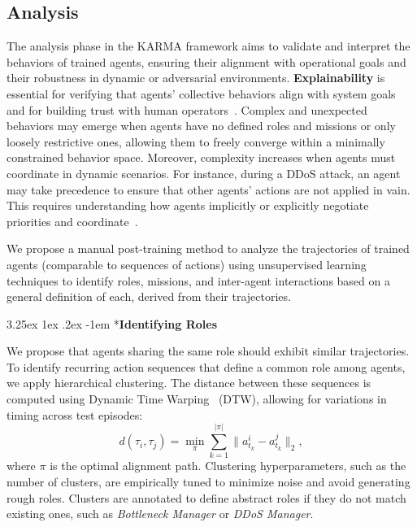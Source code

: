 \documentclass[conference]{IEEEtran}
\makeatletter
\renewcommand\paragraph{\@startsection{paragraph}{5}{\z@}%
  {3.25ex \@plus1ex \@minus.2ex}%
  {-1em}%
  {\normalfont\normalsize\bfseries}}
\makeatother
\begin{document}
\subsection{Analysis}
\label{sec:analysis}


The analysis phase in the KARMA framework aims to validate and interpret the behaviors of trained agents, ensuring their alignment with operational goals and their robustness in dynamic or adversarial environments. \textbf{Explainability} is essential for verifying that agents' collective behaviors align with system goals and for building trust with human operators~\cite{biran2017explanation, guidotti2018survey}. Complex and unexpected behaviors may emerge when agents have no defined roles and missions or only loosely restrictive ones, allowing them to freely converge within a minimally constrained behavior space. Moreover, complexity increases when agents must coordinate in dynamic scenarios. For instance, during a DDoS attack, an agent may take precedence to ensure that other agents' actions are not applied in vain. This requires understanding how agents implicitly or explicitly negotiate priorities and coordinate~\cite{Shoham2009MAS}.

We propose a manual post-training method to analyze the trajectories of trained agents (comparable to sequences of actions) using unsupervised learning techniques to identify roles, missions, and inter-agent interactions based on a general definition of each, derived from their trajectories.

\paragraph*{\textbf{Identifying Roles}}

We propose that agents sharing the same role should exhibit similar trajectories. To identify recurring action sequences that define a common role among agents, we apply hierarchical clustering. The distance between these sequences is computed using Dynamic Time Warping~\cite{berndt1994using} (DTW), allowing for variations in timing across test episodes:
\[
d(\tau_i, \tau_j) = \min_{\pi} \sum_{k=1}^{|\pi|} \|a_{t_k}^i - a_{t_k}^j\|_2,
\]
where $\pi$ is the optimal alignment path. Clustering hyperparameters, such as the number of clusters, are empirically tuned to minimize noise and avoid generating rough roles. Clusters are annotated to define abstract roles if they do not match existing ones, such as \textit{Bottleneck Manager} or \textit{DDoS Manager}.
\end{document}
